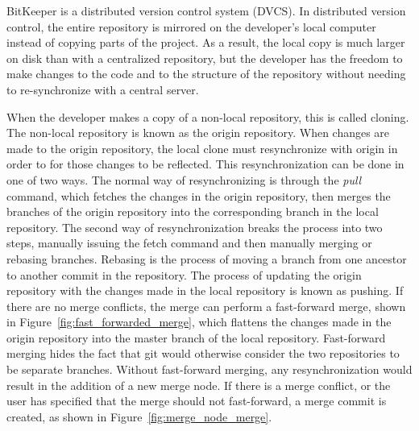 BitKeeper is a distributed version control system (DVCS).
In distributed version control, the entire repository is mirrored on
the developer's local computer instead of copying parts of the project.
As a result, the local copy is much larger on disk than with a
centralized repository, but the developer has the freedom to make
changes to the code and to the
structure of the repository without needing to re-synchronize with a
central server.

When the developer makes a copy of a non-local repository, this is
called cloning.
The non-local repository is known as the origin repository.
When changes are made to the origin repository, the local clone must
resynchronize with origin in order to for those changes to be reflected.
This resynchronization can be done in one of two ways.
The normal way of resynchronizing is through the \textit{pull} command,
which fetches the changes in the origin repository, then merges the
branches of the origin repository into the corresponding branch in the
local repository.
The second way of resynchronization breaks the process into two steps,
manually issuing the fetch command and then manually merging or rebasing
branches.
Rebasing is the process of moving a branch from one ancestor to another
commit in the repository.
The process of updating the origin repository with the changes made in
the local repository is known as pushing.
If there are no merge conflicts, the merge can perform a fast-forward
merge, shown in Figure~\ref{fig:fast_forwarded_merge},
which flattens the changes made in the origin repository into the
master branch of the local repository.
Fast-forward merging hides the fact that git would otherwise consider
the two repositories to be separate branches.
Without fast-forward merging, any resynchronization would result in the
addition of a new merge node.
If there is a merge conflict, or the user has specified that the merge
should not fast-forward, a merge commit is created, as shown in
Figure~\ref{fig:merge_node_merge}.

